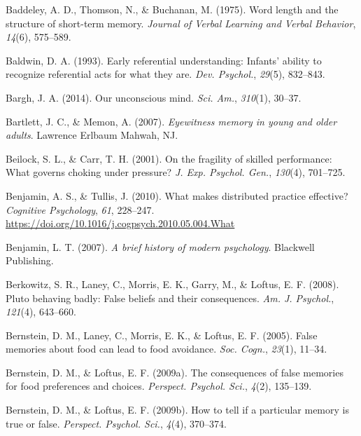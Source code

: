 \documentclass[
]{krantz}
\newlength{\cslhangindent}
\newenvironment{CSLReferences}[2] %
 {\begin{list}{}{%
  \setlength{\itemindent}{0pt}
  \setlength{\leftmargin}{0pt}
  \setlength{\parsep}{0pt}
  \ifodd #1
   \setlength{\leftmargin}{\cslhangindent}
   \setlength{\itemindent}{-1\cslhangindent}
  \fi
  \setlength{\itemsep}{#2\baselineskip}}}
 {\end{list}}
\begin{document}
\begin{CSLReferences}{1}{0}
Baddeley, A. D., Thomson, N., \& Buchanan, M. (1975). Word length and the structure of short-term memory. \emph{Journal of Verbal Learning and Verbal Behavior}, \emph{14}(6), 575--589.

Baldwin, D. A. (1993). Early referential understanding: Infants' ability to recognize referential acts for what they are. \emph{Dev. Psychol.}, \emph{29}(5), 832--843.

Bargh, J. A. (2014). Our unconscious mind. \emph{Sci. Am.}, \emph{310}(1), 30--37.

Bartlett, J. C., \& Memon, A. (2007). \emph{Eyewitness memory in young and older adults}. Lawrence Erlbaum Mahwah, NJ.

Beilock, S. L., \& Carr, T. H. (2001). On the fragility of skilled performance: What governs choking under pressure? \emph{J. Exp. Psychol. Gen.}, \emph{130}(4), 701--725.

Benjamin, A. S., \& Tullis, J. (2010). What makes distributed practice effective? \emph{Cognitive Psychology}, \emph{61}, 228--247. \url{https://doi.org/10.1016/j.cogpsych.2010.05.004.What}

Benjamin, L. T. (2007). \emph{A brief history of modern psychology}. Blackwell Publishing.

Berkowitz, S. R., Laney, C., Morris, E. K., Garry, M., \& Loftus, E. F. (2008). Pluto behaving badly: False beliefs and their consequences. \emph{Am. J. Psychol.}, \emph{121}(4), 643--660.

Bernstein, D. M., Laney, C., Morris, E. K., \& Loftus, E. F. (2005). False memories about food can lead to food avoidance. \emph{Soc. Cogn.}, \emph{23}(1), 11--34.

Bernstein, D. M., \& Loftus, E. F. (2009a). The consequences of false memories for food preferences and choices. \emph{Perspect. Psychol. Sci.}, \emph{4}(2), 135--139.

Bernstein, D. M., \& Loftus, E. F. (2009b). How to tell if a particular memory is true or false. \emph{Perspect. Psychol. Sci.}, \emph{4}(4), 370--374.


\end{CSLReferences}
\end{document}
